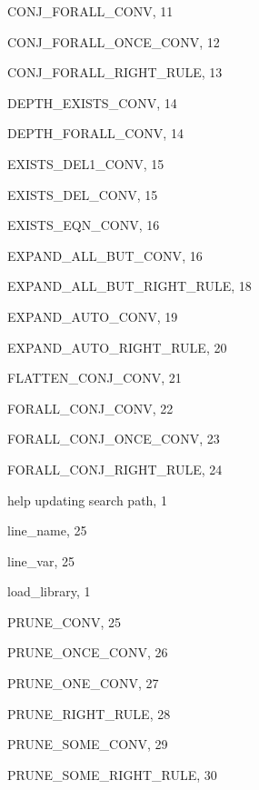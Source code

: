 \begin{theindex}

  \item {\ptt CONJ\_FORALL\_CONV}, 11
  \item {\ptt CONJ\_FORALL\_ONCE\_CONV}, 12
  \item {\ptt CONJ\_FORALL\_RIGHT\_RULE}, 13

  \indexspace

  \item {\ptt DEPTH\_EXISTS\_CONV}, 14
  \item {\ptt DEPTH\_FORALL\_CONV}, 14

  \indexspace

  \item {\ptt EXISTS\_DEL1\_CONV}, 15
  \item {\ptt EXISTS\_DEL\_CONV}, 15
  \item {\ptt EXISTS\_EQN\_CONV}, 16
  \item {\ptt EXPAND\_ALL\_BUT\_CONV}, 16
  \item {\ptt EXPAND\_ALL\_BUT\_RIGHT\_RULE}, 18
  \item {\ptt EXPAND\_AUTO\_CONV}, 19
  \item {\ptt EXPAND\_AUTO\_RIGHT\_RULE}, 20

  \indexspace

  \item {\ptt FLATTEN\_CONJ\_CONV}, 21
  \item {\ptt FORALL\_CONJ\_CONV}, 22
  \item {\ptt FORALL\_CONJ\_ONCE\_CONV}, 23
  \item {\ptt FORALL\_CONJ\_RIGHT\_RULE}, 24

  \indexspace

  \item help
    \subitem updating search path, 1

  \indexspace

  \item {\ptt line\_name}, 25
  \item {\ptt line\_var}, 25
  \item {\ptt load\_library}, 1

  \indexspace

  \item {\ptt PRUNE\_CONV}, 25
  \item {\ptt PRUNE\_ONCE\_CONV}, 26
  \item {\ptt PRUNE\_ONE\_CONV}, 27
  \item {\ptt PRUNE\_RIGHT\_RULE}, 28
  \item {\ptt PRUNE\_SOME\_CONV}, 29
  \item {\ptt PRUNE\_SOME\_RIGHT\_RULE}, 30


\end{theindex}
